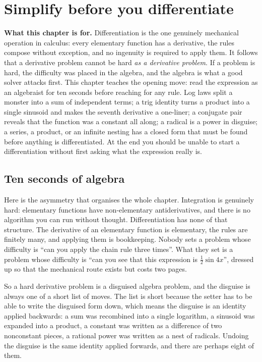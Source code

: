 \chapter{Simplify before you differentiate}

\begin{orient}
\textbf{What this chapter is for.} Differentiation is the one genuinely mechanical operation in calculus: every elementary function has a derivative, the rules compose without exception, and no ingenuity is required to apply them. It follows that a derivative problem cannot be hard \emph{as a derivative problem}. If a problem is hard, the difficulty was placed in the algebra, and the algebra is what a good solver attacks first. This chapter teaches the opening move: read the expression as an algebraist for ten seconds before reaching for any rule. Log laws split a monster into a sum of independent terms; a trig identity turns a product into a single sinusoid and makes the seventh derivative a one-liner; a conjugate pair reveals that the function was a constant all along; a radical is a power in disguise; a series, a product, or an infinite nesting has a closed form that must be found before anything is differentiated. At the end you should be unable to start a differentiation without first asking what the expression really is.
\end{orient}

\section{Ten seconds of algebra}

Here is the asymmetry that organises the whole chapter. Integration is genuinely hard: elementary functions have non-elementary antiderivatives, and there is no algorithm you can run without thought. Differentiation has none of that structure. The derivative of an elementary function is elementary, the rules are finitely many, and applying them is bookkeeping. Nobody sets a problem whose difficulty is ``can you apply the chain rule three times''. What they set is a problem whose difficulty is ``can you see that this expression is $\tfrac12\sin 4x$'', dressed up so that the mechanical route exists but costs two pages.

So a hard derivative problem is a disguised algebra problem, and the disguise is always one of a short list of moves. The list is short because the setter has to be able to write the disguised form down, which means the disguise is an identity applied backwards: a sum was recombined into a single logarithm, a sinusoid was expanded into a product, a constant was written as a difference of two nonconstant pieces, a rational power was written as a nest of radicals. Undoing the disguise is the same identity applied forwards, and there are perhaps eight of them.

